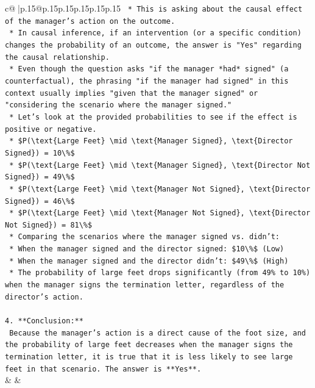 \documentclass{article}
\begin{document}
{\begin{supertabular}{c@{$\;$}|p{.15\linewidth}@{}p{.15\linewidth}p{.15\linewidth}p{.15\linewidth}p{.15\linewidth}p{.15\linewidth}}
{{{\texttt{    *   This is asking about the causal effect of the manager's action on the outcome.} \\
\texttt{    *   In causal inference, if an intervention (or a specific condition) changes the probability of an outcome, the answer is "Yes" regarding the causal relationship.} \\
\texttt{    *   Even though the question asks "if the manager *had* signed" (a counterfactual), the phrasing "if the manager had signed" in this context usually implies "given that the manager signed" or "considering the scenario where the manager signed."} \\
\texttt{    *   Let's look at the provided probabilities to see if the effect is positive or negative.} \\
\texttt{        *   \$P(\textbackslash{}text\{Large Feet\} \textbackslash{}mid \textbackslash{}text\{Manager Signed\}, \textbackslash{}text\{Director Signed\}) = 10\textbackslash{}\%\$} \\
\texttt{        *   \$P(\textbackslash{}text\{Large Feet\} \textbackslash{}mid \textbackslash{}text\{Manager Signed\}, \textbackslash{}text\{Director Not Signed\}) = 49\textbackslash{}\%\$} \\
\texttt{        *   \$P(\textbackslash{}text\{Large Feet\} \textbackslash{}mid \textbackslash{}text\{Manager Not Signed\}, \textbackslash{}text\{Director Signed\}) = 46\textbackslash{}\%\$} \\
\texttt{        *   \$P(\textbackslash{}text\{Large Feet\} \textbackslash{}mid \textbackslash{}text\{Manager Not Signed\}, \textbackslash{}text\{Director Not Signed\}) = 81\textbackslash{}\%\$} \\
\texttt{    *   Comparing the scenarios where the manager signed vs. didn't:} \\
\texttt{        *   When the manager signed and the director signed: \$10\textbackslash{}\%\$ (Low)} \\
\texttt{        *   When the manager signed and the director didn't: \$49\textbackslash{}\%\$ (High)} \\
\texttt{    *   The probability of large feet drops significantly (from 49\% to 10\%) when the manager signs the termination letter, regardless of the director's action.} \\
\\ 
\texttt{4.  **Conclusion:**} \\
\texttt{    Because the manager's action is a direct cause of the foot size, and the probability of large feet decreases when the manager signs the termination letter, it is true that it is less likely to see large feet in that scenario. The answer is **Yes**.} \\
            }
        }
    }
    & & \\ \\


\end{supertabular}}
\end{document}

